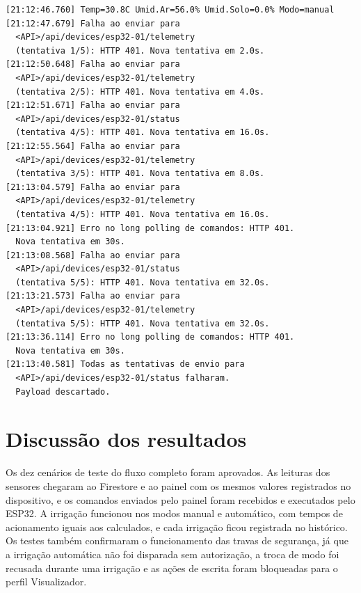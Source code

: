 \vspace{0.6\baselineskip}
\noindent\begin{minipage}{\linewidth}
\begin{lstlisting}[language={}, caption={Log do monitor serial com as requisições recusadas pela API (T10)}, label={lst:log-t10}]
[21:12:46.760] Temp=30.8C Umid.Ar=56.0% Umid.Solo=0.0% Modo=manual
[21:12:47.679] Falha ao enviar para
  <API>/api/devices/esp32-01/telemetry
  (tentativa 1/5): HTTP 401. Nova tentativa em 2.0s.
[21:12:50.648] Falha ao enviar para
  <API>/api/devices/esp32-01/telemetry
  (tentativa 2/5): HTTP 401. Nova tentativa em 4.0s.
[21:12:51.671] Falha ao enviar para
  <API>/api/devices/esp32-01/status
  (tentativa 4/5): HTTP 401. Nova tentativa em 16.0s.
[21:12:55.564] Falha ao enviar para
  <API>/api/devices/esp32-01/telemetry
  (tentativa 3/5): HTTP 401. Nova tentativa em 8.0s.
[21:13:04.579] Falha ao enviar para
  <API>/api/devices/esp32-01/telemetry
  (tentativa 4/5): HTTP 401. Nova tentativa em 16.0s.
[21:13:04.921] Erro no long polling de comandos: HTTP 401.
  Nova tentativa em 30s.
[21:13:08.568] Falha ao enviar para
  <API>/api/devices/esp32-01/status
  (tentativa 5/5): HTTP 401. Nova tentativa em 32.0s.
[21:13:21.573] Falha ao enviar para
  <API>/api/devices/esp32-01/telemetry
  (tentativa 5/5): HTTP 401. Nova tentativa em 32.0s.
[21:13:36.114] Erro no long polling de comandos: HTTP 401.
  Nova tentativa em 30s.
[21:13:40.581] Todas as tentativas de envio para
  <API>/api/devices/esp32-01/status falharam.
  Payload descartado.
\end{lstlisting}
\vspace{-0.5\baselineskip}
\end{minipage}
\medskip


\section{Discussão dos resultados}
\label{sec:discussao}

Os dez cenários de teste do fluxo completo foram aprovados. As leituras dos sensores chegaram ao Firestore e ao painel com os mesmos valores registrados no dispositivo, e os comandos enviados pelo painel foram recebidos e executados pelo ESP32. A irrigação funcionou nos modos manual e automático, com tempos de acionamento iguais aos calculados, e cada irrigação ficou registrada no histórico. Os testes também confirmaram o funcionamento das travas de segurança, já que a irrigação automática não foi disparada sem autorização, a troca de modo foi recusada durante uma irrigação e as ações de escrita foram bloqueadas para o perfil Visualizador.

